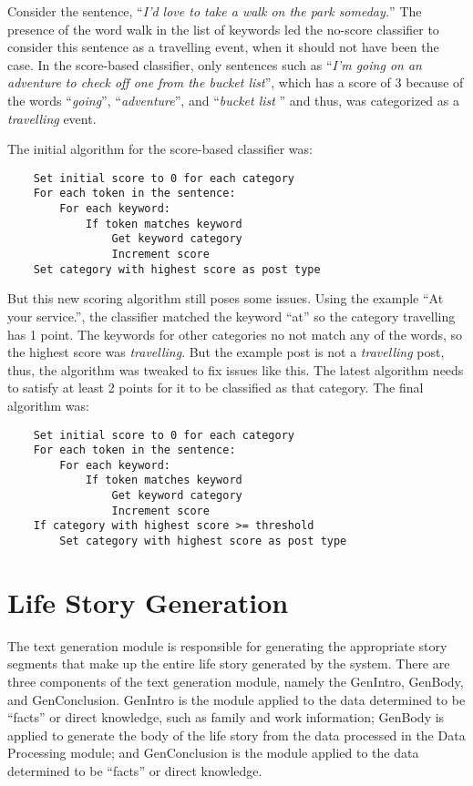 Consider the sentence, ``\textit{I'd love to take a walk on the park someday.}” The presence of the word walk in the list of keywords led the no-score classifier to consider this sentence as a travelling event, when it should not have been the case. In the score-based classifier, only sentences such as ``\textit{I'm going on an adventure to check off one from the bucket list}”, which has a score of 3 because of the words ``\textit{going}”, ``\textit{adventure}”, and ``\textit{bucket list}	” and thus, was categorized as a \textit{travelling} event.

The initial algorithm for the score-based classifier was:
\begin{lstlisting}
	Set initial score to 0 for each category
	For each token in the sentence:
		For each keyword:
			If token matches keyword
				Get keyword category
				Increment score
	Set category with highest score as post type
\end{lstlisting}

But this new scoring algorithm still poses some issues. Using the example ``At your service.”, the classifier matched the keyword ``at” so the category travelling has 1 point. The keywords for other categories no not match any of the words, so the highest score was \textit{travelling}. But the example post is not a \textit{travelling} post, thus, the algorithm was tweaked to fix issues like this. The latest algorithm needs to satisfy at least 2 points for it to be classified as that category. The final algorithm was:
\begin{lstlisting}
	Set initial score to 0 for each category
	For each token in the sentence:
		For each keyword:
			If token matches keyword
				Get keyword category
				Increment score
	If category with highest score >= threshold
		Set category with highest score as post type
\end{lstlisting}

\section{Life Story Generation}
The text generation module is responsible for generating the appropriate story segments that make up the entire life story generated by the system. There are three components of the text generation module, namely the GenIntro, GenBody, and GenConclusion. GenIntro is the module applied to the data determined to be “facts” or direct knowledge, such as family and work information; GenBody is applied to generate the body of the life story from the data processed in the Data Processing module; and GenConclusion is the module applied to the data determined to be “facts” or direct knowledge.


